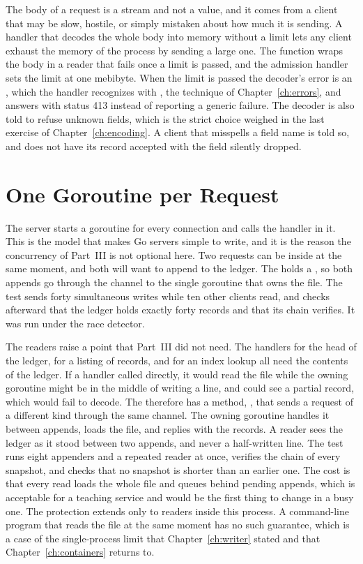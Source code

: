 The body of a request is a stream and not a value, and it comes from a client that may be slow, hostile, or simply mistaken about how much it is sending. A handler that decodes the whole body into memory without a limit lets any client exhaust the memory of the process by sending a large one. The function  wraps the body in a reader that fails once a limit is passed, and the admission handler sets the limit at one mebibyte. When the limit is passed the decoder's error is an , which the handler recognizes with , the technique of Chapter~\ref{ch:errors}, and answers with status 413 instead of reporting a generic failure. The decoder is also told to refuse unknown fields, which is the strict choice weighed in the last exercise of Chapter~\ref{ch:encoding}. A client that misspells a field name is told so, and does not have its record accepted with the field silently dropped.

\section{One Goroutine per Request}

The server starts a goroutine for every connection and calls the handler in it. This is the model that makes Go servers simple to write, and it is the reason the concurrency of Part~III is not optional here. Two requests can be inside  at the same moment, and both will want to append to the ledger. The  holds a , so both appends go through the channel to the single goroutine that owns the file. The test  sends forty simultaneous writes while ten other clients read, and checks afterward that the ledger holds exactly forty records and that its chain verifies. It was run under the race detector.

The readers raise a point that Part~III did not need. The handlers for the head of the ledger, for a listing of records, and for an index lookup all need the contents of the ledger. If a handler called  directly, it would read the file while the owning goroutine might be in the middle of writing a line, and could see a partial record, which would fail to decode. The  therefore has a method, , that sends a request of a different kind through the same channel. The owning goroutine handles it between appends, loads the file, and replies with the records. A reader sees the ledger as it stood between two appends, and never a half-written line. The test  runs eight appenders and a repeated reader at once, verifies the chain of every snapshot, and checks that no snapshot is shorter than an earlier one. The cost is that every read loads the whole file and queues behind pending appends, which is acceptable for a teaching service and would be the first thing to change in a busy one. The protection extends only to readers inside this process. A command-line program that reads the file at the same moment has no such guarantee, which is a case of the single-process limit that Chapter~\ref{ch:writer} stated and that Chapter~\ref{ch:containers} returns to.

